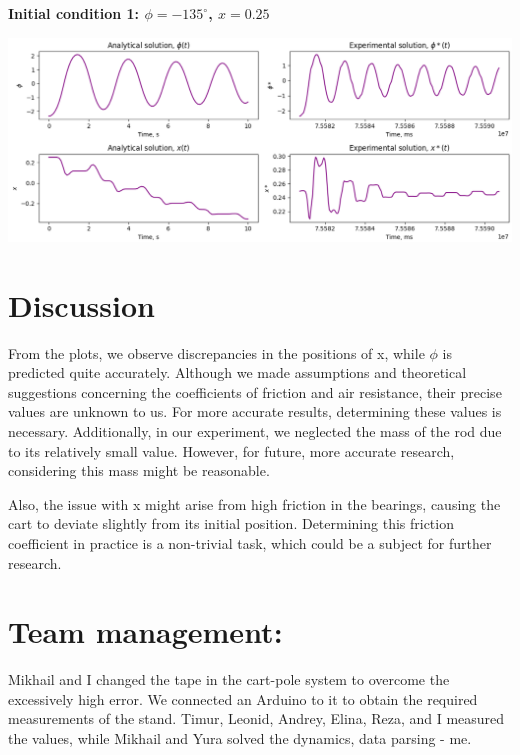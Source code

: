 \documentclass{article}
\begin{document}
\textbf{Initial condition 1: $\phi = -135^\circ$, $x = 0.25$}

\includegraphics*[scale=0.25]{graphics/res_comparison_init3.png}

\section{Discussion}

From the plots, we observe discrepancies in the positions of x, while $\phi$ is predicted quite accurately. Although we made assumptions and theoretical suggestions concerning the coefficients of friction and air resistance, their precise values are unknown to us. For more accurate results, determining these values is necessary. Additionally, in our experiment, we neglected the mass of the rod due to its relatively small value. However, for future, more accurate research, considering this mass might be reasonable.

Also, the issue with x might arise from high friction in the bearings, causing the cart to deviate slightly from its initial position. Determining this friction coefficient in practice is a non-trivial task, which could be a subject for further research.

\section{Team management:} Mikhail and I changed the tape in the cart-pole system to overcome the excessively high error. We connected an Arduino to it to obtain the required measurements of the stand. Timur, Leonid, Andrey, Elina, Reza, and I measured the values, while Mikhail and Yura solved the dynamics, data parsing - me.
\end{document}
